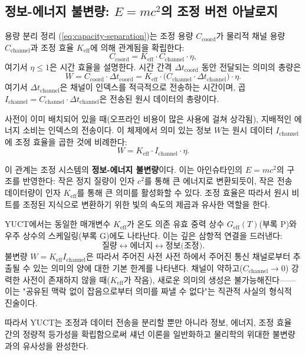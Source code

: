\documentclass[12pt,a4paper]{article}
\begin{document}
	\subsection{정보-에너지 불변량: $E=mc^2$의 조정 버전 아날로지}
	\label{subsec:info_energy_invariant}
	
	용량 분리 정리 (\ref{eq:capacity-separation})는 조정 용량 $C_{\text{coord}}$가 물리적 채널 용량 $C_{\text{channel}}$과 조정 효율 $K_{\mathrm{eff}}$에 의해 관계됨을 확립한다:
	\[
	C_{\text{coord}} = K_{\mathrm{eff}} \cdot C_{\text{channel}} \cdot \eta,
	\]
	여기서 $\eta \le 1$은 시간 효율을 설명한다. 시간 간격 $\Delta t_{\text{coord}}$ 동안 전달되는 의미의 총량은
	\[
	W = C_{\text{coord}} \cdot \Delta t_{\text{coord}} = K_{\mathrm{eff}} \cdot \bigl( C_{\text{channel}} \cdot \Delta t_{\text{channel}} \bigr) \cdot \eta.
	\]
	여기서 $\Delta t_{\text{channel}}$은 채널이 인덱스를 적극적으로 전송하는 시간이며, 곱 $I_{\text{channel}} = C_{\text{channel}} \cdot \Delta t_{\text{channel}}$은 전송된 원시 데이터의 총량이다.
	
	사전이 이미 배치되어 있을 때(오프라인 비용이 많은 사용에 걸쳐 상각됨), 지배적인 에너지 소비는 인덱스의 전송이다. 이 체제에서 의미 있는 정보 $W$는 원시 데이터 $I_{\text{channel}}$에 조정 효율을 곱한 것에 비례한다:
	\[
	\boxed{W = K_{\mathrm{eff}} \cdot I_{\text{channel}} \cdot \eta}.
	\]
	
	이 관계는 조정 시스템의 \textbf{정보-에너지 불변량}이다. 이는 아인슈타인의 $E = m c^2$의 구조를 반영한다: 작은 정지 질량이 인자 $c^2$를 통해 큰 에너지로 변환되듯이, 작은 전송 데이터량이 인자 $K_{\mathrm{eff}}$를 통해 큰 의미를 활성화할 수 있다. 조정 효율은 따라서 원시 비트를 조정된 지식으로 변환하기 위한 빛의 속도의 제곱과 유사한 역할을 한다.
	
	YUCT에서는 동일한 매개변수 $K_{\mathrm{eff}}$가 온도 의존 유효 중력 상수 $G_{\text{eff}}(T)$(부록 P)와 우주 상수의 스케일링(부록 G)에도 나타난다. 이는 깊은 삼항적 연결을 드러낸다:
	\[
	\text{질량} \leftrightarrow \text{에너지} \leftrightarrow \text{정보(조정)}.
	\]
	불변량 $W = K_{\mathrm{eff}} I_{\text{channel}}$은 따라서 주어진 사전 사전 하에서 주어진 통신 채널로부터 추출될 수 있는 의미의 양에 대한 기본 한계를 나타낸다. 채널이 약하고($C_{\text{channel}} \to 0$) 강력한 사전이 존재하지 않을 때($K_{\mathrm{eff}}$가 작음), 새로운 의미의 생성은 불가능해진다——이는 "공유된 맥락 없이 잡음으로부터 의미를 짜낼 수 없다"는 직관적 사실의 형식적 진술이다.
	
	따라서 YUCT는 조정과 데이터 전송을 분리할 뿐만 아니라 정보, 에너지, 조정 효율 간의 정량적 등가성을 확립함으로써 섀넌 이론을 일반화하고 물리학의 위대한 불변량과의 유사성을 완성한다.
	
\end{document}
